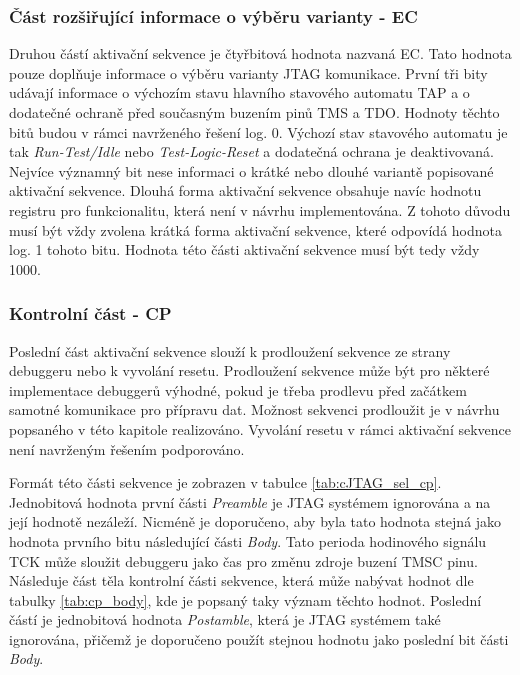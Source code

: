 \subsubsection{Část rozšiřující informace o výběru varianty - \acs{EC}}
Druhou částí aktivační sekvence je čtyřbitová hodnota nazvaná \acl{EC}. Tato hodnota pouze doplňuje informace o výběru varianty \acs{JTAG} komunikace. První tři bity udávají informace o výchozím stavu hlavního stavového automatu \acs{TAP} a o dodatečné ochraně před současným buzením pinů \acs{TMS} a \acs{TDO}. Hodnoty těchto bitů budou v rámci navrženého řešení log. 0. Výchozí stav stavového automatu je tak \textit{Run-Test/Idle} nebo \textit{Test-Logic-Reset} a dodatečná ochrana je deaktivovaná. Nejvíce významný bit nese informaci o krátké nebo dlouhé variantě popisované aktivační sekvence. Dlouhá forma aktivační sekvence obsahuje navíc hodnotu registru pro funkcionalitu, která není v návrhu implementována. Z tohoto důvodu musí být vždy zvolena krátká forma aktivační sekvence, které odpovídá hodnota log. 1 tohoto bitu. Hodnota této části aktivační sekvence musí být tedy vždy 1000. \cite{IEEE_1149-7}

\subsubsection{Kontrolní část - \acs{CP}}
Poslední část aktivační sekvence slouží k prodloužení sekvence ze strany debuggeru nebo k vyvolání resetu. Prodloužení sekvence může být pro některé implementace debuggerů výhodné, pokud je třeba prodlevu před začátkem samotné komunikace pro přípravu dat. Možnost sekvenci prodloužit je v návrhu popsaného v této kapitole realizováno. Vyvolání resetu v rámci aktivační sekvence není navrženým řešením podporováno. 

Formát této části sekvence je zobrazen v tabulce \ref{tab:cJTAG_sel_cp}. Jednobitová hodnota první části \textit{Preamble} je \acs{JTAG} systémem ignorována a na její hodnotě nezáleží. Nicméně je doporučeno, aby byla tato hodnota stejná jako hodnota prvního bitu následující části \textit{Body}. Tato perioda hodinového signálu \acs{TCK} může sloužit debuggeru jako čas pro změnu zdroje buzení TMSC pinu. Následuje část těla kontrolní části sekvence, která může nabývat hodnot dle tabulky \ref{tab:cp_body}, kde je popsaný taky význam těchto hodnot. Poslední částí je jednobitová hodnota \textit{Postamble}, která je \acs{JTAG} systémem také ignorována, přičemž je doporučeno použít stejnou hodnotu jako poslední bit části \textit{Body}. \cite{IEEE_1149-7}              

